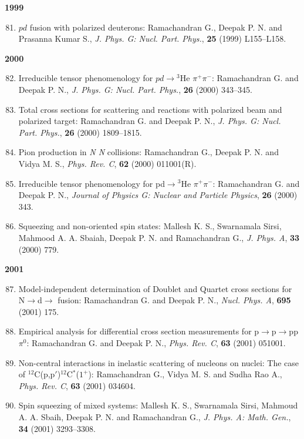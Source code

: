 \textbf{1999}
\begin{enumerate}
\setcounter{enumi}{80}
\item $pd$ fusion with polarized deuterons: Ramachandran G., Deepak P. N. and Prasanna Kumar S., \textit{J. Phys. G: Nucl. Part. Phys.}, {\bf 25} (1999) L155--L158.
\end{enumerate}
\textbf{2000}
\begin{enumerate}
\setcounter{enumi}{81}
\item Irreducible tensor phenomenology for $pd\to {}^{3}$He $\pi^{+}\pi^{-}$: Ramachandran G. and Deepak P. N., \textit{J. Phys. G: Nucl. Part. Phys.}, {\bf 26} (2000) 343--345.
\item Total cross sections for scattering and reactions with polarized beam and polarized target: Ramachandran G. and Deepak P. N., \textit{J. Phys. G: Nucl. Part. Phys.}, {\bf 26} (2000) 1809--1815.
\item Pion production in \textit{N N} collisions: Ramachandran G., Deepak P. N. and Vidya M. S., \textit{Phys. Rev. C}, {\bf 62} (2000) 011001(R).
\item Irreducible tensor phenomenology for pd$\to{}^{3}$He $\pi^{+}\pi^{-}$: Ramachandran G. and Deepak P. N., \textit{Journal of Physics G: Nuclear and Particle Physics}, {\bf 26} (2000) 343.
\item Squeezing and non-oriented spin states: Mallesh K. S., Swarnamala Sirsi, Mahmood A. A. Sbaiah, Deepak P. N. and Ramachandran G., \textit{J. Phys. A}, {\bf 33} (2000) 779.
\end{enumerate}
\textbf{2001}
\begin{enumerate}
\setcounter{enumi}{86}
\item Model-independent determination of Doublet and Quartet cross sections for N$\to$d$\to$ fusion: Ramachandran G. and Deepak P. N., \textit{Nucl. Phys. A}, {\bf 695} (2001) 175.
\item Empirical analysis for differential cross section measurements for p$\to$p$\to$pp$\pi^{0}$: Ramachandran G. and Deepak P. N., \textit{Phys. Rev. C}, {\bf 63} (2001) 051001.
\item Non-central interactions in inelastic scattering of nucleons on nuclei: The case of $^{12}$C(p,p$'$)$^{12}$C$^{*}$($1^{+}$): Ramachandran G., Vidya M. S. and Sudha Rao A., \textit{Phys. Rev. C}, {\bf 63} (2001) 034604.
\item Spin squeezing of mixed systems: Mallesh K. S., Swarnamala Sirsi, Mahmoud A. A. Sbaih, Deepak P. N. and Ramachandran G., \textit{J. Phys. A: Math. Gen.}, {\bf 34} (2001) 3293--3308.
\end{enumerate}
